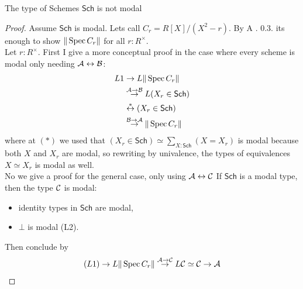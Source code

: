 \documentclass{article}
\newcommand{\Sch}{\mathsf{Sch}}
\begin{document}
\begin{corollary}
	The type of Schemes $\Sch$ is not modal
\end{corollary}
\begin{proof}
	Assume $\Sch$ is modal. Lets call $C_r = R[X] / (X^2 - r)$.  By \cite{cherubini2023foundationsyntheticalgebraicgeometry} A . 0.3. its enough to show $\|\operatorname{Spec} C_r\|$ for all $r : R^\times$. \\
	Let $r : R^\times$. %
%	
	First I give a more conceptual proof in the case where every scheme is modal only needing $\mathcal{A} \leftrightarrow \mathcal{B}$:
	\begin{align*}
	L1 &\rightarrow L \| \Spec C_r\| \\
	&\overset{\cA \rightarrow \cB}{\rightarrow} L (X_r \in \Sch) \\
	& \overset{*}{\leftrightarrow} (X_r \in \Sch ) \\
	&\overset{\cB \rightarrow \cA}{\rightarrow} \|\Spec C_r\| \\
	\end{align*}
where at $(*)$ we used that $(X_r \in \Sch) \simeq \sum_{X: \Sch} (X = X_r)$ is modal because both $X$ and $X_r$ are modal, so rewriting by univalence, the types of equivalences $X \simeq X_r$ is modal as well. \\
	
	No we give a proof for the general case, only using $\mathcal{A} \leftrightarrow \mathcal{C}$
	If $\Sch$ is a modal type, then the type $\mathcal{C}$ is modal:
	\begin{itemize}
		\item identity types in $\Sch$ are modal, 
		\item $\bot$ is modal (L2).
	\end{itemize}
	Then conclude by
	\begin{align*}
		(L1) \to L \|\operatorname{Spec} C_r\| \overset{\mathcal{A} \to \mathcal{C}}{\to} L \mathcal{C} \simeq \mathcal{C} \to \mathcal{A}
	\end{align*}
\end{proof}
\end{document}
